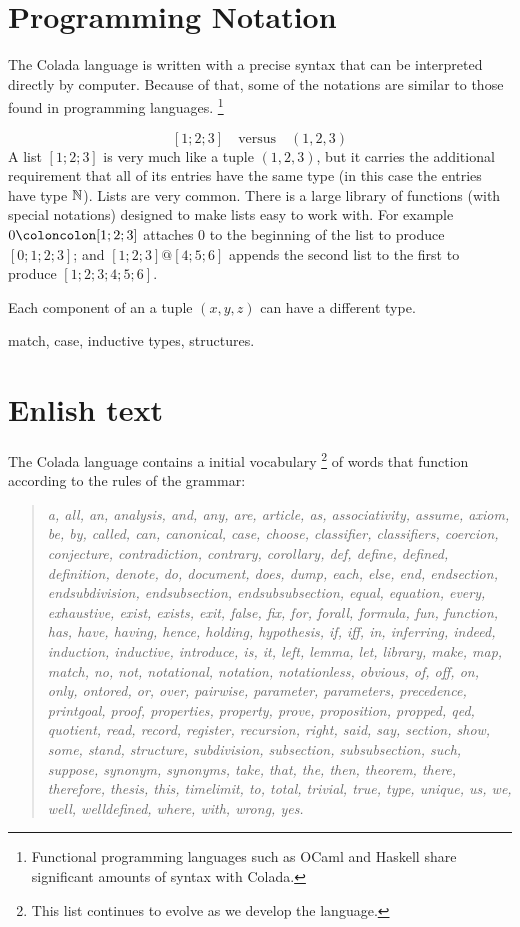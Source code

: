 \documentclass[12pt]{article}
\numberwithin{definition}{section}
\begin{document}
\section{Programming Notation}

The Colada language is written with a precise syntax that can 
be interpreted directly by computer.  Because of that, some of the
notations are similar to those found in programming languages.%
\footnote{Functional programming languages such as OCaml and Haskell
  share significant amounts of syntax with Colada.}

\[
\boxed{[1;2;3]} \quad\text{versus}\quad \boxed{(1,2,3)}
\]
A list $[1;2;3]$ is very much like a tuple $(1,2,3)$, but it
carries the additional requirement that all of its entries have the
same type (in this case the entries have type ${\mathbb N}$).  Lists are very
common.  There is a large library of functions (with special
notations) designed to make lists easy to work with.  For example $0
\coloncolon[1;2;3]$ attaches $0$ to the beginning of the list to
produce $[0;1;2;3]$; and $[1;2;3] @ [4;5;6]$ appends the second list
to the first to produce $[1;2;3;4;5;6]$.

Each component of an a tuple $(x,y,z)$ can have a different type.


match,  case, inductive types, structures.

\section{Enlish text}

The Colada language contains a initial vocabulary%
\footnote{This list continues to evolve as we develop the language.}
%
of words that function according to the rules of the grammar:

\begin{quote}
{\it a, all, an, analysis, and, any, are, article, as, associativity,
assume, axiom, be, by, called, can, canonical, case, choose,
classifier, classifiers, coercion, conjecture, contradiction,
contrary, corollary, def, define, defined, definition, denote, do,
document, does, dump, each, else, end, endsection, endsubdivision,
endsubsection, endsubsubsection, equal, equation, every, exhaustive,
exist, exists, exit, false, fix, for, forall, formula, fun, function,
has, have, having, hence, holding, hypothesis, if, iff, in, inferring,
indeed, induction, inductive, introduce, is, it, left, lemma, let,
library, make, map, match, no, not, notational, notation,
notationless, obvious, of, off, on, only, ontored, or, over, pairwise,
parameter, parameters, precedence, printgoal, proof, properties,
property, prove, proposition, propped, qed, quotient, read, record,
register, recursion, right, said, say, section, show, some, stand,
structure, subdivision, subsection, subsubsection, such, suppose,
synonym, synonyms, take, that, the, then, theorem, there, therefore,
thesis, this, timelimit, to, total, trivial, true, type, unique, us,
we, well, welldefined, where, with, wrong, yes.}
\end{quote}
\end{document}
